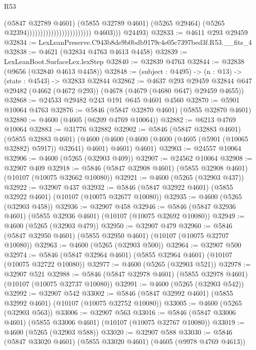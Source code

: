 \begin{lexlean}{R53}
\begin{coremodule}
                                                          (@5847 @32789 @4601)
                                                          (@5855 @32789 @4601)
                                                          (@5265 @29464)
                                                          (@5265 @32394))))))))))))))))))))))))
            @4603)))
      @24493)
@32833 := @4611 @293 @29459
@32834 := LexLeanPreserve.C943b8de9b0bdb9179c4e05c7397bed3f.R53.__fits_4
@32838 := @4621 (@32834 @4763 @4613 @4458)
@32839 := LexLeanBoot.SurfaceLex.lexStep
@32840 := @32839 @4763
@32844 := @32838 (@9656 (@32840 @4613 @4458))
@32848 := (subject : @4495) -> (n : @13) -> (state : @4543) -> @32833 @32844
@32862 := @4637
    @293
    @29459
    @32844
    @647
    @29482
    (@4662 (@4672 @293))
    (@4678 (@4679 (@4680 @647) @29459 @4655))
@32868 := @24533 @29482 @243 @191 @645 @4601 @4560
@32870 := @5901 @10064 @4763
@32876 := @5846 (@5847 @32870 @4601) (@5855 @32870 @4601)
@32880 := @4600 (@4605 (@6209 @4769 @10064))
@32882 := @6213 @4769 @10064
@32883 := @31776 @32882
@32902 := @5846
    (@5847 @32883 @4601)
    (@5855 @32883 @4601)
    (@4600 (@4600 (@4600 (@4600 (@4605 (@5901 (@10065 @32882) @5917)) @32641) @4601) @4601) @4601)
@32903 := @24557 @10064
@32906 := @4600 (@5265 (@32903 @409))
@32907 := @24562 @10064
@32908 := @32907 @409
@32918 := @5846 (@5847 @32908 @4601) (@5855 @32908 @4601) (@10107 (@10075 @32662 @10080))
@32921 := @4600 (@5265 (@32903 @437))
@32922 := @32907 @437
@32932 := @5846 (@5847 @32922 @4601) (@5855 @32922 @4601) (@10107 (@10075 @32677 @10080))
@32935 := @4600 (@5265 (@32903 @458))
@32936 := @32907 @458
@32946 := @5846 (@5847 @32936 @4601) (@5855 @32936 @4601) (@10107 (@10075 @32692 @10080))
@32949 := @4600 (@5265 (@32903 @479))
@32950 := @32907 @479
@32960 := @5846 (@5847 @32950 @4601) (@5855 @32950 @4601) (@10107 (@10075 @32707 @10080))
@32963 := @4600 (@5265 (@32903 @500))
@32964 := @32907 @500
@32974 := @5846 (@5847 @32964 @4601) (@5855 @32964 @4601) (@10107 (@10075 @32722 @10080))
@32977 := @4600 (@5265 (@32903 @521))
@32978 := @32907 @521
@32988 := @5846 (@5847 @32978 @4601) (@5855 @32978 @4601) (@10107 (@10075 @32737 @10080))
@32991 := @4600 (@5265 (@32903 @542))
@32992 := @32907 @542
@33002 := @5846 (@5847 @32992 @4601) (@5855 @32992 @4601) (@10107 (@10075 @32752 @10080))
@33005 := @4600 (@5265 (@32903 @563))
@33006 := @32907 @563
@33016 := @5846 (@5847 @33006 @4601) (@5855 @33006 @4601) (@10107 (@10075 @32767 @10080))
@33019 := @4600 (@5265 (@32903 @588))
@33020 := @32907 @588
@33030 := @5846 (@5847 @33020 @4601) (@5855 @33020 @4601) (@4605 (@9978 @4769 @4613))

\end{coremodule}
\end{lexlean}

